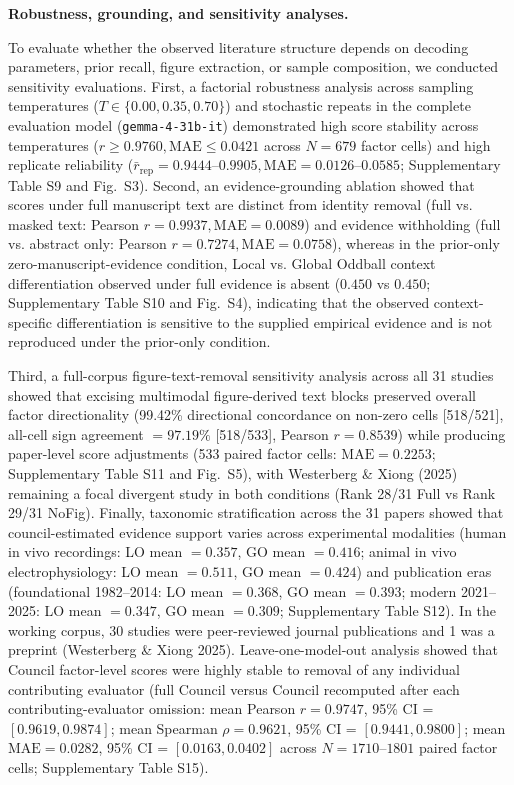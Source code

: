 \documentclass[12pt]{article}
\begin{document}
\noindent\textbf{Robustness, grounding, and sensitivity analyses.}

To evaluate whether the observed literature structure depends on decoding parameters, prior recall, figure extraction, or sample composition, we conducted sensitivity evaluations. First, a factorial robustness analysis across sampling temperatures ($T \in \{0.00, 0.35, 0.70\}$) and stochastic repeats in the complete evaluation model (\texttt{gemma-4-31b-it}) demonstrated high score stability across temperatures ($r \ge 0.9760, \text{MAE} \le 0.0421$ across $N=679$ factor cells) and high replicate reliability ($\bar{r}_{\text{rep}} = 0.9444\text{--}0.9905, \text{MAE} = 0.0126\text{--}0.0585$; Supplementary Table S9 and Fig.~S3). Second, an evidence-grounding ablation showed that scores under full manuscript text are distinct from identity removal (full vs. masked text: Pearson $r = 0.9937, \text{MAE} = 0.0089$) and evidence withholding (full vs. abstract only: Pearson $r = 0.7274, \text{MAE} = 0.0758$), whereas in the prior-only zero-manuscript-evidence condition, Local vs. Global Oddball context differentiation observed under full evidence is absent ($0.450$ vs $0.450$; Supplementary Table S10 and Fig.~S4), indicating that the observed context-specific differentiation is sensitive to the supplied empirical evidence and is not reproduced under the prior-only condition.

Third, a full-corpus figure-text-removal sensitivity analysis across all 31 studies showed that excising multimodal figure-derived text blocks preserved overall factor directionality (99.42\% directional concordance on non-zero cells [518/521], all-cell sign agreement $= 97.19\%$ [518/533], Pearson $r = 0.8539$) while producing paper-level score adjustments (533 paired factor cells: $\text{MAE} = 0.2253$; Supplementary Table S11 and Fig.~S5), with Westerberg \& Xiong (2025) remaining a focal divergent study in both conditions (Rank 28/31 Full vs Rank 29/31 NoFig). Finally, taxonomic stratification across the 31 papers showed that council-estimated evidence support varies across experimental modalities (human in vivo recordings: LO mean $= 0.357$, GO mean $= 0.416$; animal in vivo electrophysiology: LO mean $= 0.511$, GO mean $= 0.424$) and publication eras (foundational 1982--2014: LO mean $= 0.368$, GO mean $= 0.393$; modern 2021--2025: LO mean $= 0.347$, GO mean $= 0.309$; Supplementary Table S12). In the working corpus, 30 studies were peer-reviewed journal publications and 1 was a preprint (Westerberg \& Xiong 2025). Leave-one-model-out analysis showed that Council factor-level scores were highly stable to removal of any individual contributing evaluator (full Council versus Council recomputed after each contributing-evaluator omission: mean Pearson $r = 0.9747$, 95\% CI = $[0.9619, 0.9874]$; mean Spearman $\rho = 0.9621$, 95\% CI = $[0.9441, 0.9800]$; mean $\text{MAE} = 0.0282$, 95\% CI = $[0.0163, 0.0402]$ across $N = 1710\text{--}1801$ paired factor cells; Supplementary Table S15).
\end{document}
